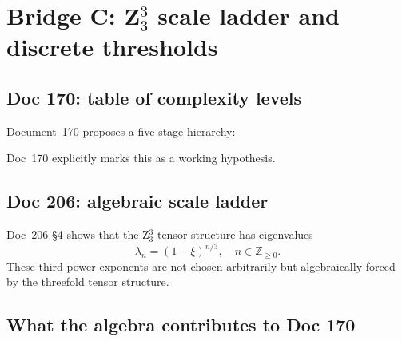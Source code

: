 \section{\texorpdfstring{Bridge C: Z$_3^3$ scale ladder and discrete thresholds}{Bridge C: Z3-cubed scale ladder and discrete thresholds}}\label{sec:bridgeC}

\subsection{Doc 170: table of complexity levels}

Document~170 proposes a five-stage hierarchy:

\begin{center}
\end{center}

Doc~170 explicitly marks this as a working hypothesis.

\subsection{Doc 206: algebraic scale ladder}

Doc~206 \S4 shows that the Z$_3^3$ tensor structure has eigenvalues
\[
\lambda_n = (1-\xi)^{n/3}, \quad n \in \mathbb{Z}_{\geq 0}.
\]
These third-power exponents are not chosen arbitrarily but algebraically forced by the threefold tensor structure.

\subsection{What the algebra contributes to Doc 170}

